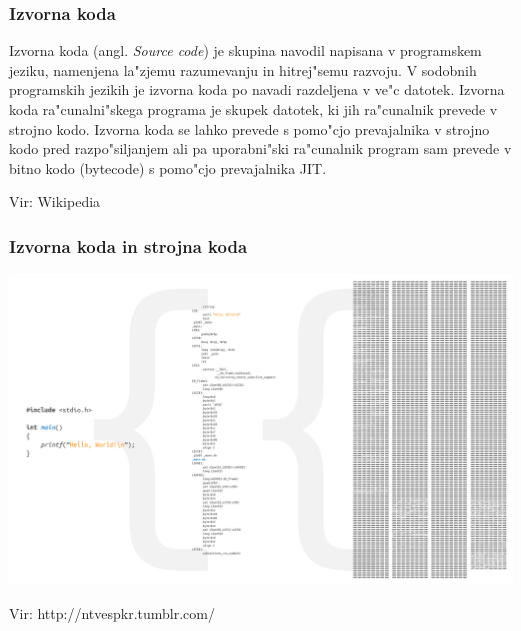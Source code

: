 \documentclass{beamer}
\newcommand{\vir}[1]{\tiny{Vir: #1}}
\begin{document}
\begin{frame}
\frametitle{Izvorna koda}
\begin{block}{}
Izvorna koda (angl. \textit{Source code}) je skupina navodil napisana v programskem jeziku, namenjena la"zjemu razumevanju in hitrej"semu razvoju. V sodobnih programskih jezikih je izvorna koda po navadi razdeljena v ve"c datotek. Izvorna koda ra"cunalni"skega programa je skupek datotek, ki jih ra"cunalnik prevede v strojno kodo. Izvorna koda se lahko prevede s pomo"cjo prevajalnika v strojno kodo pred razpo"siljanjem ali pa uporabni"ski ra"cunalnik program sam prevede v bitno kodo (bytecode) s pomo"cjo prevajalnika JIT.
\end{block}
\hfill\vir{Wikipedia}
\end{frame}

\begin{frame}
\frametitle{Izvorna koda in strojna koda}
\begin{center}
\includegraphics[width=\linewidth]{slike/source_code.png}
\end{center}
\vir{http://ntvespkr.tumblr.com/}
\end{frame}
\end{document}
